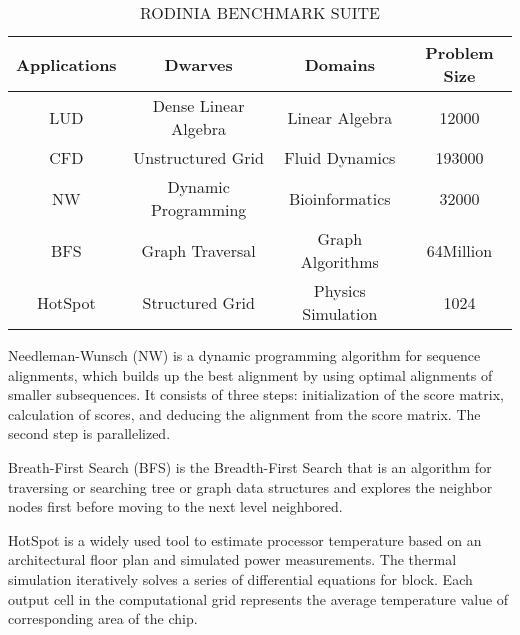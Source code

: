 \begin{table}[htbp]
  \centering
    \caption{RODINIA BENCHMARK SUITE}
  \begin{adjustbox}{width=0.5\textwidth}
    \begin{tabular}{cccc}
    \toprule
    Applications & Dwarves & Domains & Problem Size  \\
    \midrule
    LUD & Dense Linear Algebra & Linear Algebra & 12000 \\
    CFD & Unstructured Grid & Fluid Dynamics & 193000 \\
    NW & Dynamic Programming & Bioinformatics & 32000 \\
    BFS & Graph Traversal & Graph Algorithms & 64Million \\
    HotSpot & Structured Grid & Physics Simulation & 1024 \\
    \bottomrule
    \end{tabular}%
    \label{tab:benchmarks}
  \end{adjustbox}

\end{table}%


  Needleman-Wunsch (NW) is a dynamic programming algorithm for sequence alignments, which builds up the best alignment by using optimal alignments of smaller subsequences. It consists of three steps: initialization of the score matrix, calculation of scores, and deducing the alignment from the score matrix. The second step is parallelized.

  Breath-First Search (BFS) is the Breadth-First Search that is an algorithm for traversing or searching tree or graph data structures and explores the neighbor nodes first before moving to the next level neighbored.

  HotSpot is a widely used tool to estimate processor temperature based on an architectural floor plan and simulated power measurements. The thermal simulation iteratively solves a series of differential equations for block. Each output cell in the computational grid represents the average temperature value of corresponding area of the chip.